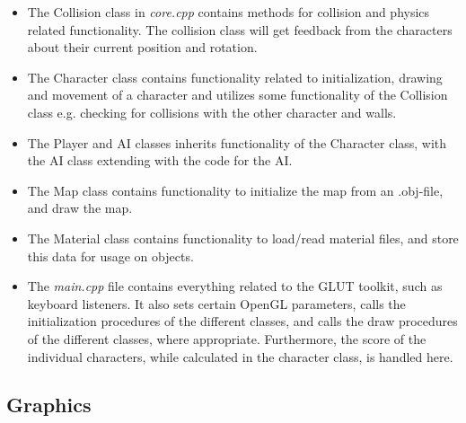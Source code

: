 \documentclass[12pt,a4paper,titlepage]{article}
\begin{document}
\begin{itemize}
\item The Collision class in \emph{core.cpp} contains methods for collision
and physics related functionality. The collision class will get feedback
from the characters about their current position and rotation.

\item The Character class contains functionality related to initialization,
drawing and movement of a character and utilizes some functionality of
the Collision class e.g. checking for collisions with the other character
and walls.

\item The Player and AI classes inherits functionality of the Character
class, with the AI class extending with the code for the AI.

\item The Map class contains functionality to initialize the map from an .obj-file,
and draw the map.

\item The Material class contains functionality to load/read material files, and
store this data for usage on objects.

\item The \emph{main.cpp} file contains everything related to the GLUT toolkit, such
as keyboard listeners. It also sets certain OpenGL parameters, calls the
initialization procedures of the different classes, and calls the draw
procedures of the different classes, where appropriate. Furthermore, the
score of the individual characters, while calculated in the character class,
is handled here.
\end{itemize}

\subsection*{Graphics}
\label{sec-2-2}
\end{document}
